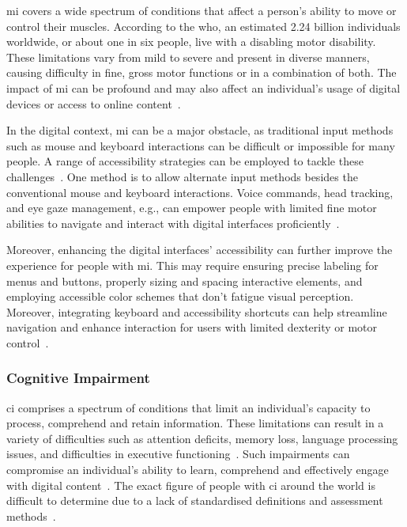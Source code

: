\Ac{mi} covers a wide spectrum of conditions that affect a person's ability to move or control their muscles. According to the \ac{who}, an estimated 2.24 billion individuals worldwide, or about one in six people, live with a disabling motor disability. These limitations vary from mild to severe and present in diverse manners, causing difficulty in fine, gross motor functions or in a combination of both. The impact of \ac{mi} can be profound and may also affect an individual's usage of digital devices or access to online content~\cite{who_mi_2023}.

In the digital context, \ac{mi} can be a major obstacle, as traditional input methods such as mouse and keyboard interactions can be difficult or impossible for many people. A range of accessibility strategies can be employed to tackle these challenges~\cite{fanucci_2011}. One method is to allow alternate input methods besides the conventional mouse and keyboard interactions. Voice commands, head tracking, and eye gaze management, e.g., can empower people with limited fine motor abilities to navigate and interact with digital interfaces proficiently~\cite{trewin_2009}.

Moreover, enhancing the digital interfaces' accessibility can further improve the experience for people with \ac{mi}. This may require ensuring precise labeling for menus and buttons, properly sizing and spacing interactive elements, and employing accessible color schemes that don't fatigue visual perception. Moreover, integrating keyboard and accessibility shortcuts can help streamline navigation and enhance interaction for users with limited dexterity or motor control~\cite{naftali_2014}.

\subsubsection{Cognitive Impairment}
\label{sec:understanding:disabilities:ci}

\Ac{ci} comprises a spectrum of conditions that limit an individual's capacity to process, comprehend and retain information. These limitations can result in a variety of difficulties such as attention deficits, memory loss, language processing issues, and difficulties in executive functioning~\cite{britto_2021}. Such impairments can compromise an individual's ability to learn, comprehend and effectively engage with digital content~\cite{gordon_2005}. The exact figure of people with \ac{ci} around the world is difficult to determine due to a lack of standardised definitions and assessment methods~\cite{pais_2020}.

